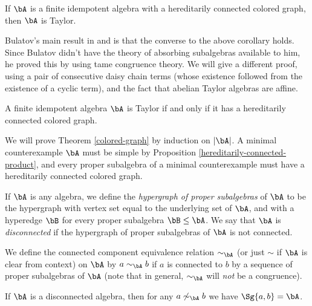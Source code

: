 \begin{cor} If $\bA$ is a finite idempotent algebra with a hereditarily connected colored graph, then $\bA$ is Taylor.
\end{cor}

Bulatov's main result in \cite{colored-graph-prelim} and \cite{colored-graph} is that the converse to the above corollary holds. Since Bulatov didn't have the theory of absorbing subalgebras available to him, he proved this by using tame congruence theory. We will give a different proof, using a pair of consecutive daisy chain terms (whose existence followed from the existence of a cyclic term), and the fact that abelian Taylor algebras are affine.%

\begin{thm}\label{colored-graph} A finite idempotent algebra $\bA$ is Taylor if and only if it has a hereditarily connected colored graph.
\end{thm}

We will prove Theorem \ref{colored-graph} by induction on $|\bA|$. A minimal counterexample $\bA$ must be simple by Proposition \ref{hereditarily-connected-product}, and every proper subalgebra of a minimal counterexample must have a hereditarily connected colored graph.

\begin{defn} If $\bA$ is any algebra, we define the \emph{hypergraph of proper subalgebras} of $\bA$ to be the hypergraph with vertex set equal to the underlying set of $\bA$, and with a hyperedge $\bB$ for every proper subalgebra $\bB \le \bA$. We say that $\bA$ is \emph{disconnected} if the hypergraph of proper subalgebras of $\bA$ is not connected.

We define the connected component equivalence relation $\sim_\bA$ (or just $\sim$ if $\bA$ is clear from context) on $\bA$ by $a \sim_\bA b$ if $a$ is connected to $b$ by a sequence of proper subalgebras of $\bA$ (note that in general, $\sim_\bA$ will \emph{not} be a congruence).
\end{defn}

\begin{prop} If $\bA$ is a disconnected algebra, then for any $a \not\sim_\bA b$ we have $\Sg\{a,b\} = \bA$.
\end{prop}

